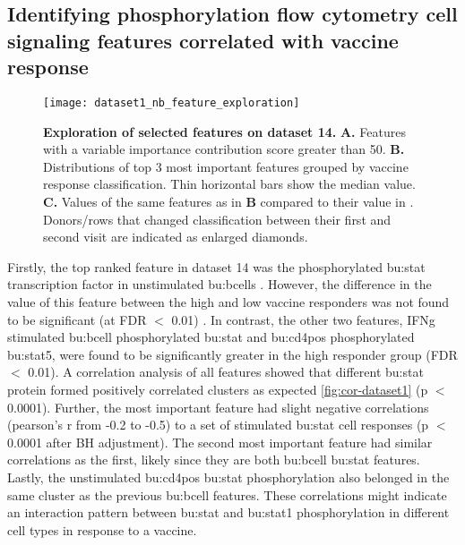 \subsection{Identifying phosphorylation flow cytometry cell signaling features correlated with vaccine response}

\begin{figure}[htpb]
    \centering
    \texttt{[image: dataset1\_nb\_feature\_exploration]}
    \caption{
        \textbf{Exploration of selected features on dataset 14.}
        \textbf{A.} Features with a variable importance contribution score greater than 50.
        \textbf{B.} Distributions of top 3 most important features grouped by vaccine response classification.
        Thin horizontal bars show the median value.
        \textbf{C.} Values of the same features as in \textbf{B} compared to their value in \secondvis.
        Donors/rows that changed classification between their first and second visit are indicated as enlarged diamonds.
    }\label{fig:dataset1-nb-feature-exploration}
\end{figure}

Firstly, the top ranked feature in dataset 14 was the phosphorylated \gls{bu:stat} transcription factor in unstimulated \gls{bu:bcell}s .
However, the difference in the value of this feature between the high and low vaccine responders was not found to be significant (at FDR $<$ 0.01) .
In contrast, the other two features, IFNg stimulated \gls{bu:bcell} phosphorylated \gls{bu:stat} and \gls{bu:cd4pos} phosphorylated \gls{bu:stat}5, were found to be significantly greater in the high responder group (FDR $<$ 0.01).
A correlation analysis of all features showed that different \gls{bu:stat} protein formed positively correlated clusters as expected \autoref{fig:cor-dataset1} (p \(<\) 0.0001).
Further, the most important feature had slight negative correlations (pearson's r from -0.2 to -0.5) to a set of stimulated \gls{bu:stat} cell responses (p \(<\) 0.0001 after BH adjustment).
The second most important feature had similar correlations as the first, likely since they are both \gls{bu:bcell} \gls{bu:stat} features.
Lastly, the unstimulated \gls{bu:cd4pos} \gls{bu:stat} phosphorylation also belonged in the same cluster as the previous \gls{bu:bcell} features.
These correlations might indicate an interaction pattern between \gls{bu:stat} and \gls{bu:stat}1 phosphorylation in different cell types in response to a vaccine.

